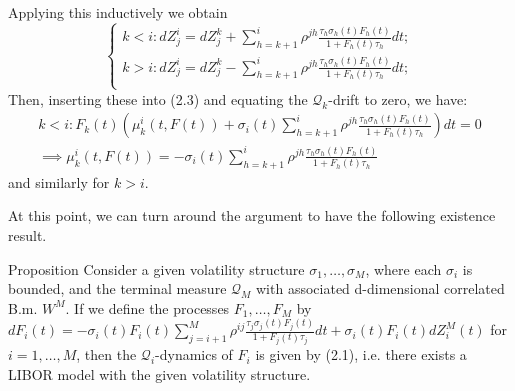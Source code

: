 \documentclass{beamer}
\begin{document}
\begin{frame}
Applying this inductively we obtain
\begin{equation}
	\begin{cases}
	k < i : dZ^i_j = dZ^k_j + \sum_{h=k+1}^i \rho^{jh}\frac{\tau_h\sigma_h(t)F_h(t)}{1+F_h(t)\tau_h} dt;\\
	k > i : dZ^i_j = dZ^k_j - \sum_{h=k+1}^i \rho^{jh}\frac{\tau_h\sigma_h(t)F_h(t)}{1+F_h(t)\tau_h} dt;\\
\end{cases}
\end{equation}
Then, inserting these into (2.3) and equating the $\mathcal{Q}_k$-drift to zero, we have:
\begin{equation}
	\begin{gathered}
	k < i : F_k(t)\left( \mu_k^i(t, F(t)) + \sigma_i(t)\sum_{h=k+1}^i \rho^{jh} \frac{\tau_h\sigma_h(t)F_h(t)}{1+F_h(t)\tau_h}\right) dt = 0 \\
	\implies \mu_k^i(t, F(t)) = - \sigma_i(t)\sum_{h=k+1}^i \rho^{jh} \frac{\tau_h\sigma_h(t)F_h(t)}{1+F_h(t)\tau_h}
	\end{gathered}
\end{equation}
and similarly for $k > i$.
\end{frame}

\begin{frame}
At this point, we can turn around the argument to have the following existence result.
\begin{block}{Proposition}
Consider a given volatility structure $\sigma_1,\ldots, \sigma_M$, where each $\sigma_i$ is bounded, and the terminal measure $\mathcal{Q}_M$ with associated d-dimensional correlated B.m. $W^M$. If we define the processes $F_1,\ldots, F_M$ by
$dF_i(t) = -\sigma_i(t)F_i(t)\sum_{j=i+1}^M \rho^{ij} \frac{\tau_j\sigma_j(t)F_j(t)}{1+F_j(t)\tau_j} dt + \sigma_i(t)F_i(t)dZ^M_i(t)$
for $i = 1,\ldots, M$, then the $\mathcal{Q}_i$-dynamics of $F_i$ is given by (2.1), i.e. there exists a LIBOR model with the given volatility structure.
\end{block}
\end{frame}
\end{document}
